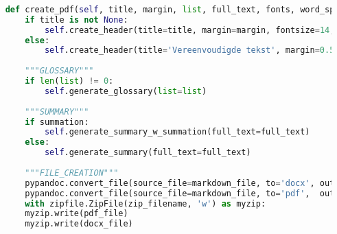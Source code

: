 \begin{lstlisting}[language=Python, caption={Writer-klasse omvattende de code om dynamische PDF- en Word-documenten te genereren.}, label={code:writer-klasse}]
	
	def create_pdf(self, title, margin, list, full_text, fonts, word_spacing, type_spacing, summation):
		if title is not None:
			self.create_header(title=title, margin=margin, fontsize=14, chosen_font=fonts[0], chosen_title_font=fonts[1], word_spacing=word_spacing, type_spacing=type_spacing)
		else:
			self.create_header(title='Vereenvoudigde tekst', margin=0.5, fontsize=14, chosen_font=fonts[0], chosen_title_font=fonts[1], word_spacing=word_spacing, type_spacing=type_spacing)
	
		"""GLOSSARY"""
		if len(list) != 0:
			self.generate_glossary(list=list)
		
		"""SUMMARY"""
		if summation:
			self.generate_summary_w_summation(full_text=full_text)
		else:
			self.generate_summary(full_text=full_text)
	
		"""FILE_CREATION"""
		pypandoc.convert_file(source_file=markdown_file, to='docx', outputfile=docx_file,   extra_args=["-M2GB", "+RTS", "-K64m", "-RTS"])
		pypandoc.convert_file(source_file=markdown_file, to='pdf',  outputfile=pdf_file,    extra_args=['--pdf-engine=xelatex'])
		with zipfile.ZipFile(zip_filename, 'w') as myzip:
		myzip.write(pdf_file)
		myzip.write(docx_file)
\end{lstlisting}


